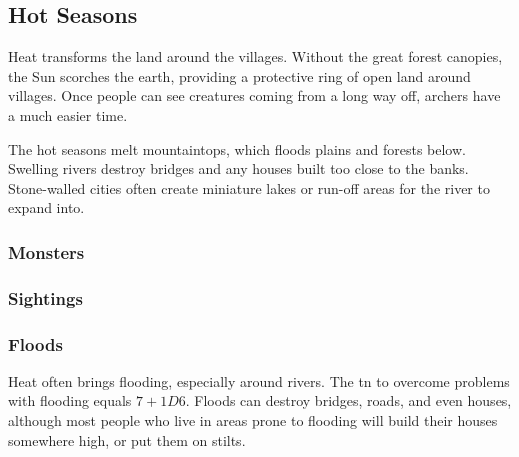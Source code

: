 \begin{multicols}{2}

\subsection{Hot Seasons}

\noindent
Heat transforms the land around the villages.
Without the great forest canopies, the Sun scorches the earth, providing a protective ring of open land around villages.
Once people can see creatures coming from a long way off, archers have a much easier time.

The hot seasons melt mountaintops, which floods plains and forests below.
Swelling rivers destroy bridges and any houses built too close to the banks.
Stone-walled cities often create miniature lakes or run-off areas for the river to expand into.

\setcounter{enc}{0}
\setcounter{track}{0}

\encWarmVillages

\encWarmEdge

\encWarmForest

\begin{multicols}{2}
\subsubsection*{Monsters}

\setcounter{enc}{4}
\begin{dlist}
\end{dlist}

\subsubsection*{Sightings}

\setcounter{track}{3}
\begin{dlist}
\end{dlist}

\end{multicols}

\subsubsection{Floods}

Heat often brings flooding, especially around rivers.
The \gls{tn} to overcome problems with flooding equals $7 + 1D6$.
Floods can destroy bridges, roads, and even houses, although most people who live in areas prone to flooding will build their houses somewhere high, or put them on stilts.


\end{multicols}
